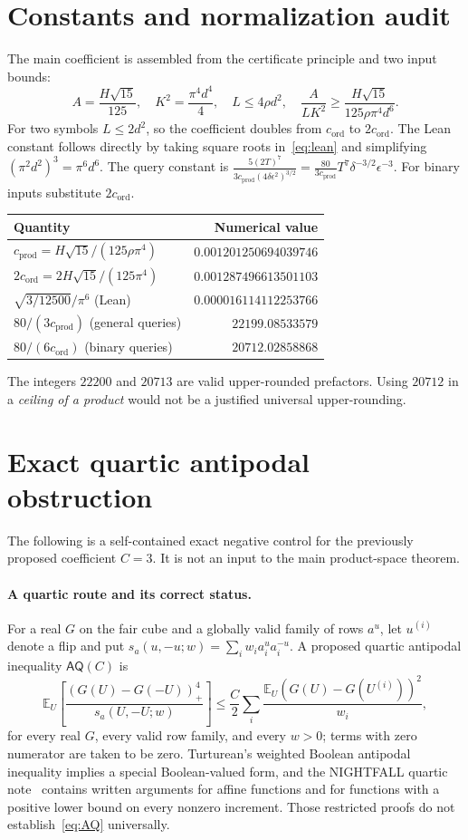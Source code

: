 \documentclass[11pt]{article}
\numberwithin{equation}{section}
\theoremstyle{remark}
\newcommand{\E}{\mathbb E}
\newcommand{\cprod}{c_{\mathrm{prod}}}
\newcommand{\cord}{c_{\mathrm{ord}}}
\newcommand{\pos}[1]{(#1)_{+}}
\begin{document}
\section{Constants and normalization audit}\label{app:constants}
The main coefficient is assembled from the certificate principle and two input bounds:
\[
 A=\frac{H\sqrt{15}}{125},\quad K^2=\frac{\pi^4d^4}{4},\quad
 L\le4\rho d^2,\quad \frac{A}{LK^2}\ge\frac{H\sqrt{15}}{125\rho\pi^4d^6}.
\]
For two symbols $L\le2d^2$, so the coefficient doubles from $\cord$ to $2\cord$. The Lean constant follows directly by taking square roots in~\eqref{eq:lean} and simplifying $(\pi^2d^2)^3=\pi^6d^6$.
The query constant is $\frac{5(2T)^7}{3\cprod(4\delta\epsilon^2)^{3/2}}=\frac{80}{3\cprod}T^7\delta^{-3/2}\epsilon^{-3}$. For binary inputs substitute $2\cord$.
\begin{center}
\begin{tabular}{@{}>{\raggedright\arraybackslash}p{.48\linewidth}r@{}}\toprule
Quantity & Numerical value\\\midrule
$\cprod=H\sqrt{15}/(125\rho\pi^4)$ & $0.001201250694039746$\\
$2\cord=2H\sqrt{15}/(125\pi^4)$ & $0.001287496613501103$\\
$\sqrt{3/12500}/\pi^6$ (Lean) & $0.000016114112253766$\\
$80/(3\cprod)$ (general queries) & $22199.08533579$\\
$80/(6\cord)$ (binary queries) & $20712.02858868$\\\bottomrule
\end{tabular}
\end{center}
The integers $22200$ and $20713$ are valid upper-rounded prefactors. Using $20712$ in a \emph{ceiling of a product} would not be a justified universal upper-rounding.

\section{Exact quartic antipodal obstruction}\label{app:quartic}
The following is a self-contained exact negative control for the
previously proposed coefficient $C=3$. It is not an input to the main
product-space theorem.
\paragraph{A quartic route and its correct status.}
For a real $G$ on the fair cube and a globally valid family of rows $a^u$, let $u^{(i)}$ denote a flip and put
$s_a(u,-u;w)=\sum_iw_i a_i^ua_i^{-u}$. A proposed quartic antipodal inequality $\mathsf{AQ}(C)$ is
\begin{equation}\label{eq:AQ}
 \E_U\left[\frac{\pos{G(U)-G(-U)}^4}{s_a(U,-U;w)}\right]
 \le\frac C2\sum_i\frac{\E_U(G(U)-G(U^{(i)}))^2}{w_i},
\end{equation}
for every real $G$, every valid row family, and every $w>0$; terms with zero numerator are taken to be zero. Turturean's weighted Boolean antipodal inequality implies a special Boolean-valued form, and the NIGHTFALL quartic note~\cite{WriQuartic} contains written arguments for affine functions and for functions with a positive lower bound on every nonzero increment. Those restricted proofs do not establish~\eqref{eq:AQ} universally.
\end{document}
